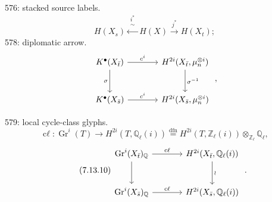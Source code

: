 \documentclass{article}
\newcommand{\Gr}{\operatorname{Gr}}
\begin{document}
576: stacked source labels.
\[
  H(X_s)\xleftarrow{\substack{i^*\\\sim}}H(X)\xrightarrow{j^*}H(X_t);
\]
578: diplomatic arrow.
\[
\begin{tikzcd}[column sep=large,row sep=large]
K^\bullet(X_{\bar t}) \arrow[r,"c^i"] \arrow[d,"\sigma"'] &
H^{2i}(X_{\bar t},\mu_n^{\otimes i}) \arrow[d,"\sigma^{-1}"]\\
K^\bullet(X_{\bar s}) \arrow[r,"c^i"] &
H^{2i}(X_{\bar s},\mu_n^{\otimes i})
\end{tikzcd}
\;,
\]

579: local cycle-class glyphs.
\begin{equation}\tag{7.13.7}
  \operatorname{c\ell}:\Gr^i(T)\longrightarrow H^{2i}(T,\mathbb Q_\ell(i))
  \stackrel{\mathrm{dfn}}{=}
  H^{2i}(T,\mathbb Z_\ell(i))\otimes_{\mathbb Z_\ell}\mathbb Q_\ell,
\end{equation}
\begin{equation}\tag{7.13.10}
\begin{tikzcd}[column sep=large,row sep=large]
\Gr^i(X_{\bar t})_{\mathbb Q} \arrow[r,"\operatorname{c\ell}"] \arrow[d] &
H^{2i}(X_{\bar t},\mathbb Q_\ell(i)) \arrow[d,"\wr"]\\
\Gr^i(X_{\bar s})_{\mathbb Q} \arrow[r,"\operatorname{c\ell}"] &
H^{2i}(X_{\bar s},\mathbb Q_\ell(i))
\end{tikzcd}
\;.
\end{equation}
\end{document}
